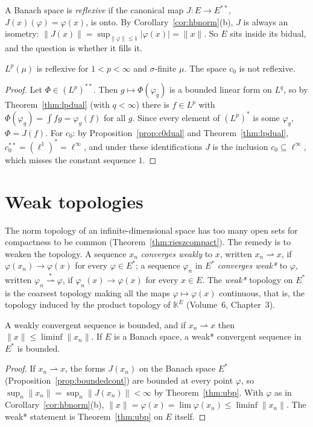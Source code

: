 A Banach space is \emph{reflexive} if the canonical map $J:E\to E^{**}$, $J(x)(\varphi)=\varphi(x)$, is onto. By Corollary~\ref{cor:hbnorm}(b), $J$ is always an isometry: $\|J(x)\|=\sup_{\|\varphi\|\le1}|\varphi(x)|=\|x\|$. So $E$ sits inside
its bidual, and the question is whether it fills it.

\begin{proposition}\label{prop:reflexive}
$L^p(\mu)$ is reflexive for $1<p<\infty$ and $\sigma$-finite $\mu$. The space $c_0$ is not reflexive.
\end{proposition}
\begin{proof}
Let $\Phi\in(L^p)^{**}$. Then $g\mapsto\Phi(\varphi_g)$ is a bounded linear form on $L^q$, so by Theorem~\ref{thm:lpdual} (with $q<\infty$) there is $f\in L^p$ with $\Phi(\varphi_g)=\int fg=\varphi_g(f)$ for all $g$. Since every element of
$(L^p)^*$ is some $\varphi_g$, $\Phi=J(f)$. For $c_0$: by Proposition~\ref{prop:c0dual} and Theorem~\ref{thm:lpdual}, $c_0^{**}=(\ell^1)^*=\ell^\infty$, and under these identifications $J$ is the inclusion $c_0\subseteq\ell^\infty$, which
misses the constant sequence $1$.
\end{proof}

\section{Weak topologies}

The norm topology of an infinite-dimensional space has too many open sets for compactness to be common (Theorem~\ref{thm:rieszcompact}). The remedy is to weaken the topology. A sequence $x_n$ \emph{converges weakly} to $x$,
written $x_n\rightharpoonup x$, if $\varphi(x_n)\to\varphi(x)$ for every $\varphi\in E^*$; a sequence $\varphi_n$ in $E^*$ \emph{converges weak*} to $\varphi$, written $\varphi_n\overset*\rightharpoonup\varphi$, if $\varphi_n(x)\to\varphi(x)$ for every
$x\in E$. The \emph{weak*} topology on $E^*$ is the coarsest topology making all the maps $\varphi\mapsto\varphi(x)$ continuous, that is, the topology induced by the product topology of $\mathbb K^E$ (Volume~6, Chapter~3).

\begin{proposition}\label{prop:weakbounded}
A weakly convergent sequence is bounded, and if $x_n\rightharpoonup x$ then $\|x\|\le\liminf\|x_n\|$. If $E$ is a Banach space, a weak* convergent sequence in $E^*$ is bounded.
\end{proposition}
\begin{proof}
If $x_n\rightharpoonup x$, the forms $J(x_n)$ on the Banach space $E^*$ (Proposition~\ref{prop:boundedcont}) are bounded at every point $\varphi$, so $\sup_n\|x_n\|=\sup_n\|J(x_n)\|<\infty$ by Theorem~\ref{thm:ubp}. With $\varphi$ as in
Corollary~\ref{cor:hbnorm}(b), $\|x\|=\varphi(x)=\lim\varphi(x_n)\le\liminf\|x_n\|$. The weak* statement is Theorem~\ref{thm:ubp} on $E$ itself.
\end{proof}

